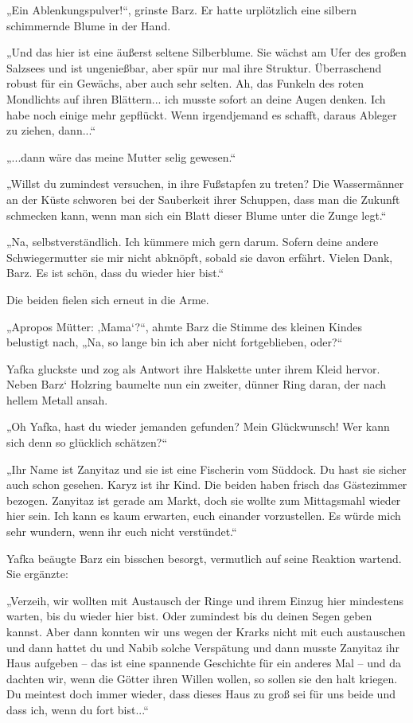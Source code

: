 „Ein Ablenkungspulver!“, grinste Barz. Er hatte urplötzlich eine silbern schimmernde Blume in der Hand.

„Und das hier ist eine äußerst seltene Silberblume. Sie wächst am Ufer des großen Salzsees und ist ungenießbar, aber spür nur mal ihre Struktur. Überraschend robust für ein Gewächs, aber auch sehr selten. Ah, das Funkeln des roten Mondlichts auf ihren Blättern... ich musste sofort an deine Augen denken. Ich habe noch einige mehr gepflückt. Wenn irgendjemand es schafft, daraus Ableger zu ziehen, dann...“

„...dann wäre das meine Mutter selig gewesen.“

„Willst du zumindest versuchen, in ihre Fußstapfen zu treten? Die Wassermänner an der Küste schworen bei der Sauberkeit ihrer Schuppen, dass man die Zukunft schmecken kann, wenn man sich ein Blatt dieser Blume unter die Zunge legt.“

„Na, selbstverständlich. Ich kümmere mich gern darum. Sofern deine andere Schwiegermutter sie mir nicht abknöpft, sobald sie davon erfährt. Vielen Dank, Barz. Es ist schön, dass du wieder hier bist.“

Die beiden fielen sich erneut in die Arme.

„Apropos Mütter: ‚Mama‘?“, ahmte Barz die Stimme des kleinen Kindes belustigt nach, „Na, so lange bin ich aber nicht fortgeblieben, oder?“

Yafka gluckste und zog als Antwort ihre Halskette unter ihrem Kleid hervor. Neben Barz‘ Holzring baumelte nun ein zweiter, dünner Ring daran, der nach hellem Metall ansah.

„Oh Yafka, hast du wieder jemanden gefunden? Mein Glückwunsch! Wer kann sich denn so glücklich schätzen?“

„Ihr Name ist Zanyitaz und sie ist eine Fischerin vom Süddock. Du hast sie sicher auch schon gesehen. Karyz ist ihr Kind. Die beiden haben frisch das Gästezimmer bezogen. Zanyitaz ist gerade am Markt, doch sie wollte zum Mittagsmahl wieder hier sein. Ich kann es kaum erwarten, euch einander vorzustellen. Es würde mich sehr wundern, wenn ihr euch nicht verstündet.“

Yafka beäugte Barz ein bisschen besorgt, vermutlich auf seine Reaktion wartend. Sie ergänzte:

„Verzeih, wir wollten mit Austausch der Ringe und ihrem Einzug hier mindestens warten, bis du wieder hier bist. Oder zumindest bis du deinen Segen geben kannst. Aber dann konnten wir uns wegen der Krarks nicht mit euch austauschen und dann hattet du und Nabib solche Verspätung und dann musste Zanyitaz ihr Haus aufgeben – das ist eine spannende Geschichte für ein anderes Mal – und da dachten wir, wenn die Götter ihren Willen wollen, so sollen sie den halt kriegen. Du meintest doch immer wieder, dass dieses Haus zu groß sei für uns beide und dass ich, wenn du fort bist...“

